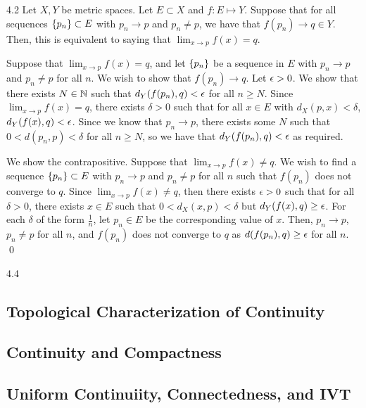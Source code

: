\begin{theorem}{}{4.2}
    Let $X, Y$ be metric spaces. Let $E \subset X$ and $f:E \mapsto Y$. Suppose that for all sequences $\set{p_n} \subset E$ with $p_n \rightarrow p$ and $p_n \neq p$, we have that $f(p_n) \rightarrow q \in Y$. Then, this is equivalent to saying that $\lim_{x \rightarrow p} f(x) = q$.
\end{theorem}
\begin{nproof}
    \boxed{\implies} Suppose that $\lim_{x \rightarrow p} f(x) = q$, and let $\set{p_n}$ be a sequence in $E$ with $p_n \rightarrow p$ and $p_n \neq p$ for all $n$. We wish to show that $f(p_n) \rightarrow q$. Let $\epsilon > 0$. We show that there exists $N \in \mathbb{N}$ such that $d_Y(f(p_n), q) < \epsilon$ for all $n \geq N$. Since $\lim_{x \rightarrow p} f(x) = q$, there exists $\delta > 0$ such that for all $x \in E$ with $d_X(p, x) < \delta$, $d_Y(f(x),q) < \epsilon$. Since we know that $p_n \rightarrow p$, there exists some $N$ such that $0 < d(p_n, p) < \delta$ for all $n \geq N$, so we have that $d_Y(f(p_n), q) < \epsilon$ as required. 

    \boxed{\impliedby} We show the contrapositive. Suppose that $\lim_{x \rightarrow p} f(x) \neq q$. We wish to find a sequence $\set{p_n} \subset E$ with $p_n \rightarrow p$ and $p_n \neq p$ for all $n$ such that $f(p_n)$ does not converge to $q$. Since $\lim_{x \rightarrow p} f(x) \neq q$, then there exists $\epsilon > 0$ such that for all $\delta > 0$, there exists $x \in E$ such that $0 < d_X(x, p) < \delta$ but $d_Y(f(x), q) \geq \epsilon$. For each $\delta$ of the form $\frac{1}{n}$, let $p_n \in E$ be the corresponding value of $x$. Then, $p_n \rightarrow p$, $p_n \neq p$ for all $n$, and $f(p_n)$ does not converge to $q$ as $d(f(p_n), q) \geq \epsilon$ for all $n$. \qed
\end{nproof}


\begin{theorem}{}{4.4}
    
\end{theorem}

\subsection{Topological Characterization of Continuity}

\subsection{Continuity and Compactness}

\subsection{Uniform Continuiity, Connectedness, and IVT}

